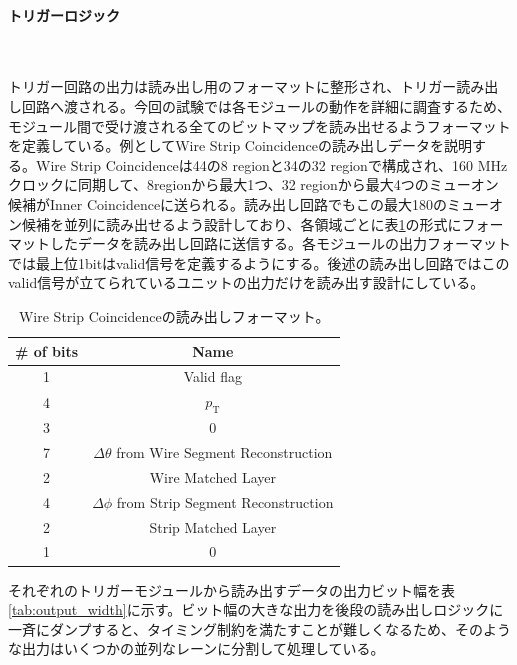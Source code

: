\paragraph{トリガーロジック}　　
\par
トリガー回路の出力は読み出し用のフォーマットに整形され、トリガー読み出し回路へ渡される。今回の試験では各モジュールの動作を詳細に調査するため、モジュール間で受け渡される全てのビットマップを読み出せるようフォーマットを定義している。例としてWire Strip Coincidenceの読み出しデータを説明する。Wire Strip Coincidenceは44の8 regionと34の32 regionで構成され、160 MHzクロックに同期して、8regionから最大1つ、32 regionから最大4つのミューオン候補がInner Coincidenceに送られる。読み出し回路でもこの最大180のミューオン候補を並列に読み出せるよう設計しており、各領域ごとに表\ref{tab:WS_format}の形式にフォーマットしたデータを読み出し回路に送信する。各モジュールの出力フォーマットでは最上位1bitはvalid信号を定義するようにする。後述の読み出し回路ではこのvalid信号が立てられているユニットの出力だけを読み出す設計にしている。

\begin{table}[]
    \centering
    \caption[Wire Strip Coincidenceの読み出しフォーマット]{Wire Strip Coincidenceの読み出しフォーマット。}
    \label{tab:WS_format}
    \begin{tabular}{|c|c|}
    \hline
    \# of bits & Name                                            \\ \hline\hline
    1          & Valid flag                                      \\ \hline
    4          & $p_{\mathrm{T}}$                                \\ \hline
    3          & 0                                               \\ \hline
    7          & $\Delta\theta$ from Wire Segment Reconstruction \\ \hline
    2          & Wire Matched Layer                              \\ \hline
    4          & $\Delta\phi$ from Strip Segment Reconstruction \\ \hline
    2          & Strip Matched Layer                             \\ \hline
    1          & 0                                               \\ \hline
    \end{tabular}
\end{table}


それぞれのトリガーモジュールから読み出すデータの出力ビット幅を表\ref{tab:output_width}に示す。ビット幅の大きな出力を後段の読み出しロジックに一斉にダンプすると、タイミング制約を満たすことが難しくなるため、そのような出力はいくつかの並列なレーンに分割して処理している。

